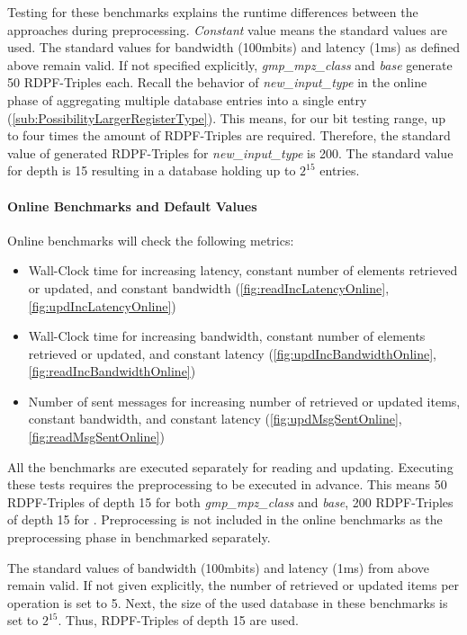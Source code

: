 Testing for these benchmarks explains the runtime differences between the approaches during preprocessing.
\textit{Constant} value means the standard values are used.
The standard values for bandwidth (100mbits) and latency (1ms) as defined above remain valid.
If not specified explicitly, \textit{gmp\_mpz\_class} and \textit{base} generate 50 RDPF-Triples each.
Recall the behavior of \textit{new\_input\_type} in the online phase of aggregating multiple database entries into a single entry (\ref{sub:PossibilityLargerRegisterType}).
This means, for our bit testing range, up to four times the amount of RDPF-Triples are required.
Therefore, the standard value of generated RDPF-Triples for \textit{new\_input\_type} is 200.
The standard value for depth is 15 resulting in a database holding up to $2^{15}$ entries.

\paragraph{Online Benchmarks and Default Values}\label{par:onlineBenchmarksNumbers}
Online benchmarks will check the following metrics:
\begin{itemize}
    \item Wall-Clock time for increasing latency, constant number of elements retrieved or updated, and constant bandwidth (\ref{fig:readIncLatencyOnline}, \ref{fig:updIncLatencyOnline})
    \item Wall-Clock time for increasing bandwidth, constant number of elements retrieved or updated, and constant latency (\ref{fig:updIncBandwidthOnline}, \ref{fig:readIncBandwidthOnline})
    \item Number of sent messages for increasing number of retrieved or updated items, constant bandwidth, and constant latency (\ref{fig:updMsgSentOnline}, \ref{fig:readMsgSentOnline})
\end{itemize}

All the benchmarks are executed separately for reading and updating.
Executing these tests requires the preprocessing to be executed in advance.
This means 50 RDPF-Triples of depth 15 for both \textit{gmp\_mpz\_class} and \textit{base}, 200 RDPF-Triples of depth 15 for .
Preprocessing is not included in the online benchmarks as the preprocessing phase in benchmarked separately.

The standard values of bandwidth (100mbits) and latency (1ms) from above remain valid.
If not given explicitly, the number of retrieved or updated items per operation is set to 5.
Next, the size of the used database in these benchmarks is set to $2^{15}$.
Thus, RDPF-Triples of depth 15 are used.

